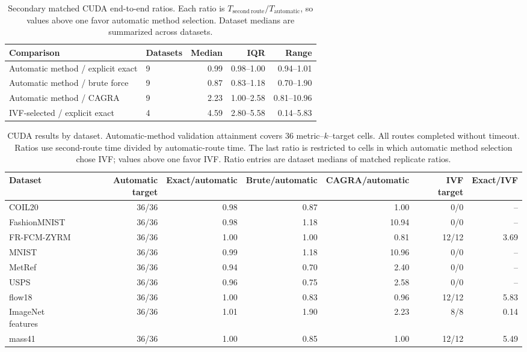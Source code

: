 \documentclass[11pt]{article}
\begin{document}
\begin{table}[ht]
\centering
\small

\begin{tabularx}{\textwidth}{@{}Xlrrr@{}}
\toprule
Comparison & Datasets & Median & IQR & Range \\
\midrule
Automatic method / explicit exact & 9 & 0.99 & 0.98--1.00 & 0.94--1.01 \\
Automatic method / brute force & 9 & 0.87 & 0.83--1.18 & 0.70--1.90 \\
Automatic method / CAGRA & 9 & 2.23 & 1.00--2.58 & 0.81--10.96 \\
IVF-selected / explicit exact & 4 & 4.59 & 2.80--5.58 & 0.14--5.83 \\
\bottomrule
\end{tabularx}
\caption{Secondary matched CUDA end-to-end ratios. Each ratio is
\(T_{\mathrm{second\ route}}/T_{\mathrm{automatic}}\), so values above one
favor automatic method selection. Dataset medians are summarized across datasets.}
\label{tab:supp-cuda-paired}
\end{table}

\begin{table}[ht]
\centering
\small

\setlength{\tabcolsep}{3.2pt}
\begin{tabular}{@{}lrrrrrr@{}}
\toprule
Dataset & Automatic target & Exact/automatic & Brute/automatic & CAGRA/automatic & IVF target & Exact/IVF \\
\midrule
COIL20 & 36/36 & 0.98 & 0.87 & 1.00 & 0/0 & -- \\
FashionMNIST & 36/36 & 0.98 & 1.18 & 10.94 & 0/0 & -- \\
FR-FCM-ZYRM & 36/36 & 1.00 & 1.00 & 0.81 & 12/12 & 3.69 \\
MNIST & 36/36 & 0.99 & 1.18 & 10.96 & 0/0 & -- \\
MetRef & 36/36 & 0.94 & 0.70 & 2.40 & 0/0 & -- \\
USPS & 36/36 & 0.96 & 0.75 & 2.58 & 0/0 & -- \\
flow18 & 36/36 & 1.00 & 0.83 & 0.96 & 12/12 & 5.83 \\
ImageNet features & 36/36 & 1.01 & 1.90 & 2.23 & 8/8 & 0.14 \\
mass41 & 36/36 & 1.00 & 0.85 & 1.00 & 12/12 & 5.49 \\
\bottomrule
\end{tabular}
\caption{CUDA results by dataset. Automatic-method validation attainment covers 36
metric--$k$--target cells. All routes completed without timeout. Ratios use
second-route time divided by automatic-route time. The last ratio is restricted
to cells in which automatic method selection chose IVF; values above one favor IVF.
Ratio entries are dataset medians of matched replicate ratios.}
\label{tab:supp-cuda-dataset}
\end{table}
\end{document}
